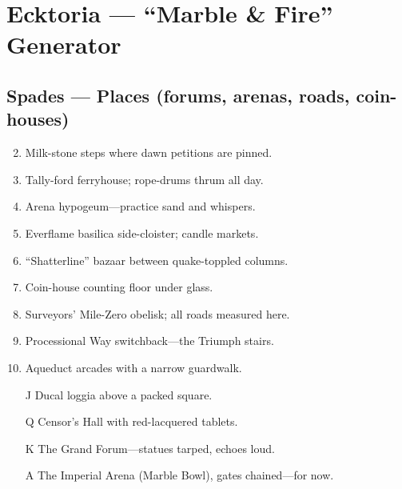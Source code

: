 \chapter{Ecktoria --- ``Marble \& Fire'' Generator}

\section*{Spades --- Places (forums, arenas, roads, coin-houses)}
\begin{enumerate}
\setcounter{enumi}{1}
\item Milk-stone steps where dawn petitions are pinned.
\item Tally-ford ferryhouse; rope-drums thrum all day.
\item Arena hypogeum---practice sand and whispers.
\item Everflame basilica side-cloister; candle markets.
\item ``Shatterline'' bazaar between quake-toppled columns.
\item Coin-house counting floor under glass.
\item Surveyors' Mile-Zero obelisk; all roads measured here.
\item Processional Way switchback---the Triumph stairs.
\item Aqueduct arcades with a narrow guardwalk.
\item[J] Ducal loggia above a packed square.
\item[Q] Censor's Hall with red-lacquered tablets.
\item[K] The Grand Forum---statues tarped, echoes loud.
\item[A] The Imperial Arena (Marble Bowl), gates chained---for now.
\end{enumerate}

